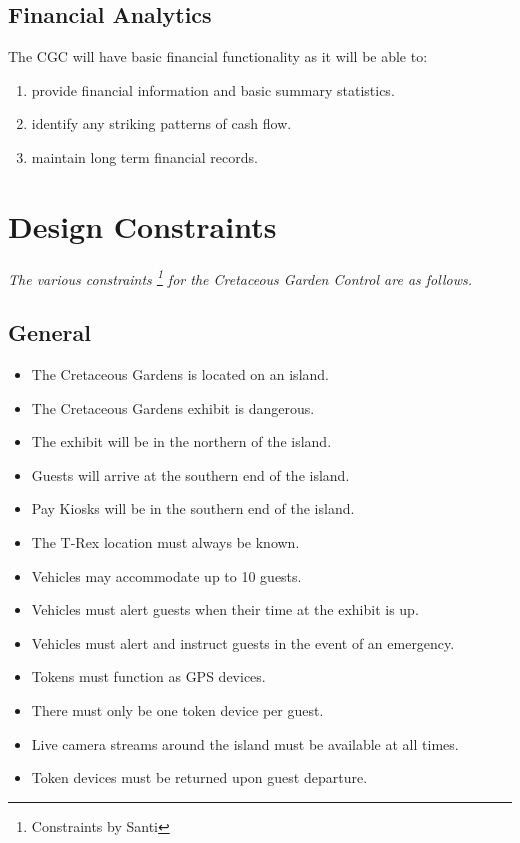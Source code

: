 \documentclass[12pt]{article}
\begin{document}
	\subsection{Financial Analytics} The CGC will have basic financial functionality as it will
	be able to:
	\begin{enumerate}
		\item provide financial information and basic summary statistics.
		\item identify any striking patterns of cash flow.
		\item maintain long term financial records.
	\end{enumerate}

\section{Design Constraints}
\label{con}
\paragraph{} \textit{The various constraints \footnote{Constraints by Santi} for the Cretaceous Garden Control are as follows.}
	\subsection{General}
	\begin{itemize}
		\item The Cretaceous Gardens is located on an island.
		\item The Cretaceous Gardens exhibit is dangerous.
		\item The exhibit will be in the northern of the island.
		\item Guests will arrive at the southern end of the island.
		\item Pay Kiosks will be in the southern end of the island.
		\item The T-Rex location must always be known.
		\item Vehicles may accommodate up to 10 guests.
		\item Vehicles must alert guests when their time at the exhibit is up.
		\item Vehicles must alert and instruct guests in the event of an emergency.
		\item Tokens must function as GPS devices.
		\item There must only be one token device per guest.
		\item Live camera streams around the island must be available at all times.
		\item Token devices must be returned upon guest departure.
	\end{itemize}
	
\end{document}
